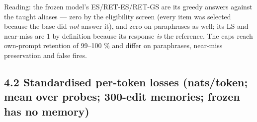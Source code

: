 \documentclass[10pt,a4paper]{article}
\begin{document}
Reading: the frozen model's ES/RET-ES/RET-GS are its greedy answers against the taught aliases — zero by the eligibility screen (every item was selected because the base did \emph{not} answer it), and zero on paraphrases as well; its LS and near-miss are 1 by definition because its response \emph{is} the reference. The caps reach own-prompt retention of 99–100 \% and differ on paraphrases, near-miss preservation and false fires.



\subsection*{4.2 Standardised per-token losses (nats/token; mean over probes; 300-edit memories; frozen has no memory)}
\end{document}
